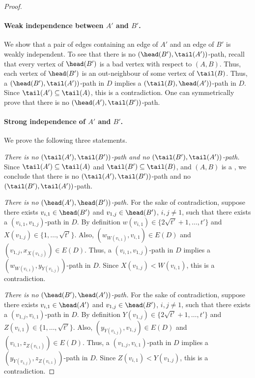 \begin{proof}
\paragraph*{Weak independence between $A'$ and $B'$.} We show that a pair of edges containing an edge of $A'$ and an edge of $B'$ is weakly independent.
To see that there is no $(\head(B'),\tail(A'))$-path, 
recall that every vertex of $\head(B')$ is a bad vertex with respect to $(A,B)$.
Thus, each vertex of $\head(B')$ is an out-neighbour of some vertex of $\tail(B)$. Thus, a $(\head(B'),\tail(A'))$-path in $D$ implies a $(\tail(B),\head(A'))$-path in $D$. Since $\tail(A') \subseteq \tail(A)$, this is a contradiction. One can symmetrically prove that there is no
$(\head(A'),\tail(B'))$-path.

\paragraph*{Strong independence of $A'$ and $B'$.} We prove the following three statements.

{\it There is no $(\tail(A'),\tail(B'))$-path and no $(\tail(B'),\tail(A'))$-path.} Since $\tail(A') \subseteq \tail(A)$ and $\tail(B') \subseteq \tail(B)$, and $(A,B)$ is a  \toughpair, we conclude that there is no $(\tail(A'),\allowbreak
\tail(B'))$-path and no $(\tail(B'),\tail(A'))$-path.

{\it There is no $(\head(A'),\head(B'))$-path.} For the sake of contradiction, suppose there exists $v_{i,1} \in \head(B')$ and $v_{1,j} \in \head(B')$, $i,j \neq 1$, such that there exists a $(v_{i,1}, v_{1,j})$-path in $D$. By definition $w(v_{i,1}) \in \{2\sqrt{t'}+1, \ldots, t'\}$ and $X(v_{1,j}) \in \{1, \ldots, \sqrt{t'}\}$. Also, $(w_{W(v_{i,1})}, v_{i,1}) \in E(D)$ and $(v_{1,j}, x_{X(v_{1,j})}) \in E(D)$. Thus, a $(v_{i,1}, v_{1,j})$-path in $D$ implies a $(w_{W(v_{i,1})}, y_{Y(v_{1,j})})$-path in $D$. Since $X(v_{1,j}) < W(v_{i,1})$, this is a contradiction.

{\it There is no $(\head(B'),\head(A'))$-path.} For the sake of contradiction, suppose there exists $v_{i,1} \in \head(A')$ and $v_{1,j} \in \head(B')$, $i,j \neq 1$, such that there exists a $(v_{1,j}, v_{i,1})$-path in $D$. By definition $Y(v_{1,j}) \in \{2\sqrt{t'}+1, \ldots, t'\}$ and $Z(v_{i,1}) \in \{1, \ldots, \sqrt{t'}\}$. Also, $(y_{Y(v_{1,j})}, v_{1,j}) \in E(D)$ and $(v_{i,1}, z_{Z(v_{i,1})}) \in E(D)$. Thus, a $(v_{1,j}, v_{i,1})$-path in $D$ implies a $(y_{Y(v_{1,j})}, z_{Z(v_{i,1})})$-path in $D$. Since $Z(v_{i,1}) < Y(v_{1,j})$, this is a contradiction.


\end{proof}

